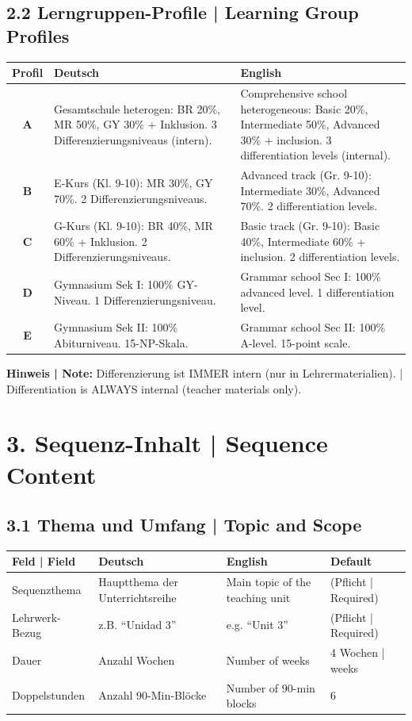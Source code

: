 \documentclass[11pt,a4paper]{article}
\begin{document}
\subsection*{2.2 Lerngruppen-Profile | Learning Group Profiles}

\begin{tabularx}{\textwidth}{|c|X|X|}
\hline
\rowcolor{lightgray}
\textbf{Profil} & \textbf{Deutsch} & \textbf{English} \\
\hline
\textbf{A} &
Gesamtschule heterogen: BR 20\%, MR 50\%, GY 30\% + Inklusion. 3 Differenzierungsniveaus (intern). &
Comprehensive school heterogeneous: Basic 20\%, Intermediate 50\%, Advanced 30\% + inclusion. 3 differentiation levels (internal). \\
\hline
\textbf{B} &
E-Kurs (Kl. 9-10): MR 30\%, GY 70\%. 2 Differenzierungsniveaus. &
Advanced track (Gr. 9-10): Intermediate 30\%, Advanced 70\%. 2 differentiation levels. \\
\hline
\textbf{C} &
G-Kurs (Kl. 9-10): BR 40\%, MR 60\% + Inklusion. 2 Differenzierungsniveaus. &
Basic track (Gr. 9-10): Basic 40\%, Intermediate 60\% + inclusion. 2 differentiation levels. \\
\hline
\textbf{D} &
Gymnasium Sek I: 100\% GY-Niveau. 1 Differenzierungsniveau. &
Grammar school Sec I: 100\% advanced level. 1 differentiation level. \\
\hline
\textbf{E} &
Gymnasium Sek II: 100\% Abiturniveau. 15-NP-Skala. &
Grammar school Sec II: 100\% A-level. 15-point scale. \\
\hline
\end{tabularx}

\vspace{0.3cm}
\textbf{Hinweis | Note:} Differenzierung ist IMMER intern (nur in Lehrermaterialien). | Differentiation is ALWAYS internal (teacher materials only).

\newpage

\section*{\textcolor{spanisch}{3. Sequenz-Inhalt | Sequence Content}}

\subsection*{3.1 Thema und Umfang | Topic and Scope}

\begin{tabularx}{\textwidth}{|l|X|X|l|}
\hline
\rowcolor{lightgray}
\textbf{Feld | Field} & \textbf{Deutsch} & \textbf{English} & \textbf{Default} \\
\hline
Sequenzthema & Hauptthema der Unterrichtsreihe & Main topic of the teaching unit & (Pflicht | Required) \\
\hline
Lehrwerk-Bezug & z.B. ``Unidad 3'' & e.g. ``Unit 3'' & (Pflicht | Required) \\
\hline
Dauer & Anzahl Wochen & Number of weeks & 4 Wochen | weeks \\
\hline
Doppelstunden & Anzahl 90-Min-Blöcke & Number of 90-min blocks & 6 \\
\hline
\end{tabularx}
\end{document}
